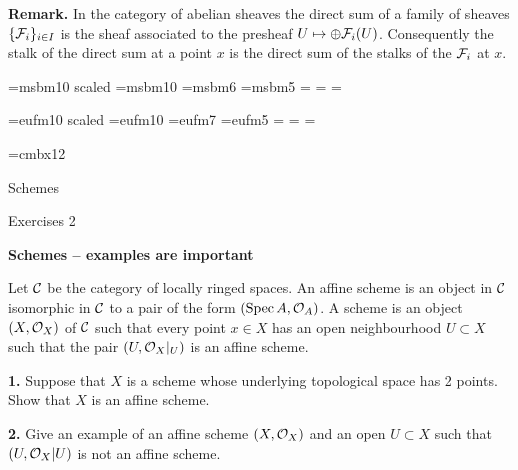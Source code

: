 \medskip\noindent
{\bf Remark.} In the category of abelian sheaves the direct sum of
a family of sheaves $\{{\cal F}_i\}_{i\in I}$ is the sheaf associated to
the presheaf $U \mapsto \oplus {\cal F}_i(U)$. Consequently the stalk of
the direct sum at a point $x$ is the direct sum of the stalks of the 
${\cal F}_i$ at $x$.

\bye
\magnification{}
\nopagenumbers

\font\gbbb=msbm10 scaled 
\font\bbbf=msbm10 
\font\sbbb=msbm6 
\font\ssbbb=msbm5 
=\bbbf
{}=\sbbb 
{}=\ssbbb 
\def\bbb{\fam6}
\def\mP{{\bbb P}} 
\def\mA{{\bbb A}} 
\def\mB{{\bbb B}} 
\def\mR{{\bbb R}}
\def\mZ{{\bbb Z}}

\font\ggothic=eufm10 scaled 
\font\gothicf=eufm10
\font\sgothic=eufm7
\font\ssgothic=eufm5
=\gothicf
{}=\sgothic
{}=\ssgothic
\def\gothic{\fam5}


\font\Kopfont=cmbx12
\def\mapright#1{\smash{\mathop{\longrightarrow}\limits^{#1}}}
\def\mapdown#1{\Big\downarrow\rlap{$\vcenter{\hbox{$\scriptstyle#1$}}$}}
\def\downmap#1{\downarrow\rlap{$\vcenter{\hbox{$\scriptstyle#1$}}$}}
\def\mapup#1{\Big\uparrow\rlap{$\vcenter{\hbox{$\scriptstyle#1$}}$}}
\def\longlongrightarrow{\relbar \joinrel \longrightarrow}
\def\cC{{\cal C}}
\def\cD{{\cal D}}
\def\gp{{\gothic p}}
\def\gq{{\gothic q}}
\def\Spec{\mathop{\rm Spec}}

\centerline{\Kopfont Schemes}

\smallskip
\centerline{Exercises 2}

\bigskip\noindent
{\bf Schemes -- examples are important}

\bigskip\noindent
Let ${\cal C}$ be the category of locally ringed spaces.
An affine scheme is an object in ${\cal C}$ isomorphic in ${\cal C}$ to
a pair of the form $(\Spec A, {\cal O}_A)$. A scheme is an
object $(X, {\cal O}_X)$ of ${\cal C}$ such that every point $x\in X$ 
has an open neighbourhood $U \subset X$ such that the pair
$(U, {\cal O}_X|_U)$ is an affine scheme.

\bigskip\item{\bf 1.} Suppose that $X$ is a scheme whose underlying 
topological space has 2 points. Show that $X$ is an affine scheme.

\medskip\item{\bf 2.} Give an example of an affine scheme $(X, {\cal O}_X)$
and an open $U \subset X$ such that $(U, {\cal O}_X|U)$ is not an affine
scheme.

